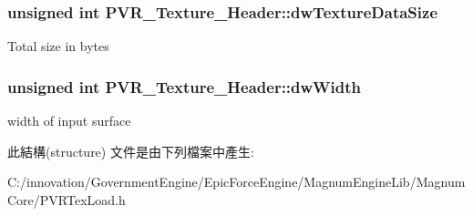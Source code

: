 \subsubsection[{\texorpdfstring{dw\+Texture\+Data\+Size}{dwTextureDataSize}}]{\setlength{\rightskip}{0pt plus 5cm}unsigned int P\+V\+R\+\_\+\+Texture\+\_\+\+Header\+::dw\+Texture\+Data\+Size}\hypertarget{struct_p_v_r___texture___header_ad2a7eea61233461d085191891734177f}{}\label{struct_p_v_r___texture___header_ad2a7eea61233461d085191891734177f}
Total size in bytes 
\subsubsection[{\texorpdfstring{dw\+Width}{dwWidth}}]{\setlength{\rightskip}{0pt plus 5cm}unsigned int P\+V\+R\+\_\+\+Texture\+\_\+\+Header\+::dw\+Width}\hypertarget{struct_p_v_r___texture___header_a35506d49c7fb8fe89cf2d35ec1727bdd}{}\label{struct_p_v_r___texture___header_a35506d49c7fb8fe89cf2d35ec1727bdd}
width of input surface 

此結構(structure) 文件是由下列檔案中產生\+:\begin{DoxyCompactItemize}
\item 
C\+:/innovation/\+Government\+Engine/\+Epic\+Force\+Engine/\+Magnum\+Engine\+Lib/\+Magnum\+Core/P\+V\+R\+Tex\+Load.\+h\end{DoxyCompactItemize}
